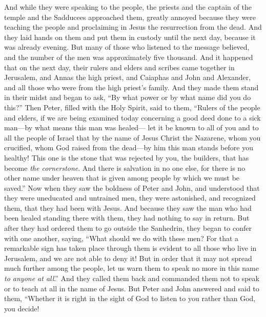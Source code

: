 \begin{biblechapter} %
 And while they were speaking to the people, the priests and the captain of the temple and the Sadducees approached them,
\verse greatly annoyed because they were teaching the people and proclaiming in Jesus the resurrection from the dead.
\verse And they laid hands on them and put them in custody until the next day, because it was already evening.
\verse But many of those who listened to the message believed, and the number of the men was approximately five thousand.
 And it happened that on the next day, their rulers and elders and scribes came together in Jerusalem,
\verse and Annas the high priest, and Caiaphas and John and Alexander, and all those who were from the high priest’s family.
\verse And they made them stand in their midst and began to ask, “By what power or by what name did you do this?”
\verse Then Peter, filled with the Holy Spirit, said to them, “Rulers of the people and elders,
\verse if we are being examined today concerning a good deed done to a sick man—by what means this man was healed—
\verse let it be known to all of you and to all the people of Israel that by the name of Jesus Christ the Nazarene, whom you crucified, whom God raised from the dead—by him this man stands before you healthy!
\verse This one is the stone that was rejected by you, the builders, that has become \textit{the cornerstone}.
\verse And there is salvation in no one else, for there is no other name under heaven that is given among people by which we must be saved.”
\verse Now when they saw the boldness of Peter and John, and understood that they were uneducated and untrained men, they were astonished, and recognized them, that they had been with Jesus.
\verse And because they saw the man who had been healed standing there with them, they had nothing to say in return.
\verse But after they had ordered them to go outside the Sanhedrin, they began to confer with one another,
\verse saying, “What should we do with these men? For that a remarkable sign has taken place through them is evident to all those who live in Jerusalem, and we are not able to deny it!
\verse But in order that it may not spread much further among the people, let us warn them to speak no more in this name \textit{to anyone at all}.”
\verse And they called them back and commanded them not to speak or to teach at all in the name of Jesus.
\verse But Peter and John answered and said to them, “Whether it is right in the sight of God to listen to you rather than God, you decide!

\end{biblechapter}
